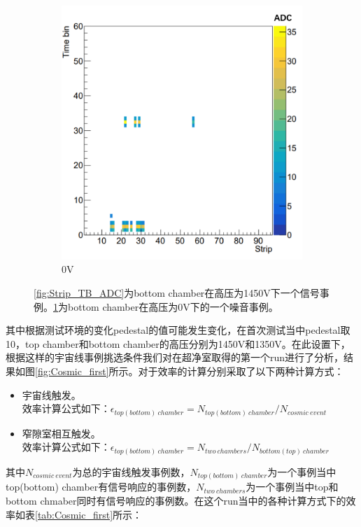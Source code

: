 \begin{figure}[htb]
\begin{subfigure}[b]{0.45\textwidth}
        \includegraphics[width=\textwidth,clip]{figures/Chapter3/Strip_TB_ADC_noise.png}
        \caption{0V}
        \label{fig:Strip_TB_ADC_noise}
    \end{subfigure}
    \caption[一个事例当中每个读出条上ADC随time bin 分布示意图]{\ref{fig:Strip_TB_ADC}为bottom chamber在高压为1450V下一个信号事例。\ref{fig:Strip_TB_ADC_noise}为bottom chamber在高压为0V下的一个噪音事例。}
       \label{fig:Signal_3D}
\end{figure}
其中根据测试环境的变化pedestal的值可能发生变化，在首次测试当中pedestal取10，top chamber和bottom chamber的高压分别为1450V和1350V。在此设置下，根据这样的宇宙线事例挑选条件我们对在超净室取得的第一个run进行了分析，结果如图\ref{fig:Cosmic_first}所示。对于效率的计算分别采取了以下两种计算方式：
\begin{itemize}
    \item 宇宙线触发。
    \\效率计算公式如下：$\epsilon_{top(bottom)~chamber} = N_{top(bottom)~chamber}/N_{cosmic~event}$
    \item 窄隙室相互触发。
    \\效率计算公式如下：$\epsilon_{top(bottom)~chamber} = N_{two~chambers}/N_{bottom(top)~chamber}$
\end{itemize}
其中$N_{cosmic~event}$为总的宇宙线触发事例数，$N_{top(bottom)~chamber}$为一个事例当中top(bottom) chamber有信号响应的事例数，$N_{two~chambers}$为一个事例当中top和bottom chmaber同时有信号响应的事例数。在这个run当中的各种计算方式下的效率如表\ref{tab:Cosmic_first}所示：
